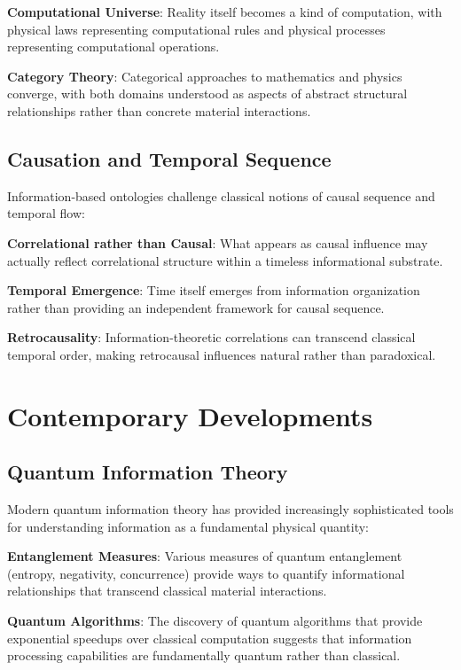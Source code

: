 \documentclass[12pt]{article}
\begin{document}
\textbf{Computational Universe}: Reality itself becomes a kind of computation, with physical laws representing computational rules and physical processes representing computational operations.

\textbf{Category Theory}: Categorical approaches to mathematics and physics converge, with both domains understood as aspects of abstract structural relationships rather than concrete material interactions.

\subsection{Causation and Temporal Sequence}

Information-based ontologies challenge classical notions of causal sequence and temporal flow:

\textbf{Correlational rather than Causal}: What appears as causal influence may actually reflect correlational structure within a timeless informational substrate.

\textbf{Temporal Emergence}: Time itself emerges from information organization rather than providing an independent framework for causal sequence.

\textbf{Retrocausality}: Information-theoretic correlations can transcend classical temporal order, making retrocausal influences natural rather than paradoxical.

\section{Contemporary Developments}

\subsection{Quantum Information Theory}

Modern quantum information theory has provided increasingly sophisticated tools for understanding information as a fundamental physical quantity:

\textbf{Entanglement Measures}: Various measures of quantum entanglement (entropy, negativity, concurrence) provide ways to quantify informational relationships that transcend classical material interactions.

\textbf{Quantum Algorithms}: The discovery of quantum algorithms that provide exponential speedups over classical computation suggests that information processing capabilities are fundamentally quantum rather than classical.
\end{document}
